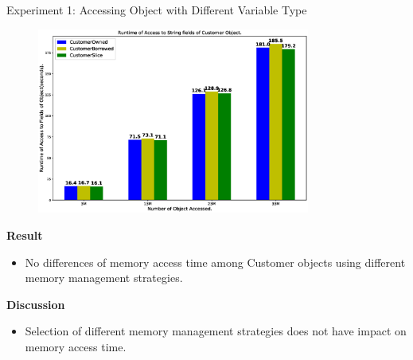 \documentclass[9pt]{beamer}
\begin{document}
\begin{frame}[t, fragile]{Experiment 1: Accessing Object with Different Variable Type}
    \vspace{-0.7cm}
    \begin{figure}[hp]
        \centering
        \begin{center}
                \includegraphics[width=0.8\textwidth]{images/rust_access_different_poniter_init.eps}
                \captionsetup{labelformat=empty}
        \end{center}
    \end{figure}
    \vspace{-1cm}
    \textbf{Result}
    \begin{itemize}
        \item No differences of memory access time among Customer objects using different memory management strategies.
    \end{itemize}
    \textbf{Discussion}
    \begin{itemize}
        \item Selection of different memory management strategies does not have impact on memory access time.
    \end{itemize}

\end{frame}

\end{document}
